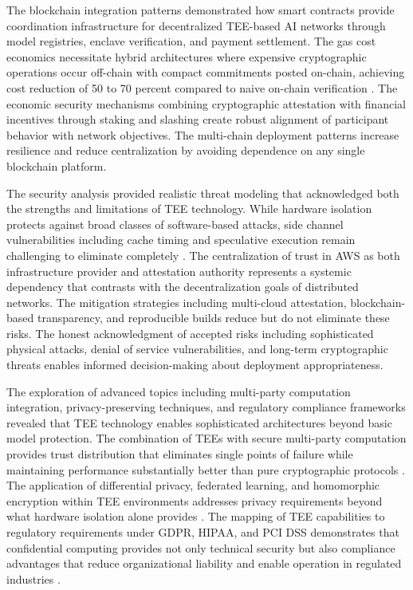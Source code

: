 The blockchain integration patterns demonstrated how smart contracts provide coordination infrastructure for decentralized TEE-based AI networks through model registries, enclave verification, and payment settlement. The gas cost economics necessitate hybrid architectures where expensive cryptographic operations occur off-chain with compact commitments posted on-chain, achieving cost reduction of 50 to 70 percent compared to naive on-chain verification \cite{gas_optimization}. The economic security mechanisms combining cryptographic attestation with financial incentives through staking and slashing create robust alignment of participant behavior with network objectives. The multi-chain deployment patterns increase resilience and reduce centralization by avoiding dependence on any single blockchain platform.

The security analysis provided realistic threat modeling that acknowledged both the strengths and limitations of TEE technology. While hardware isolation protects against broad classes of software-based attacks, side channel vulnerabilities including cache timing and speculative execution remain challenging to eliminate completely \cite{spectre_meltdown, foreshadow}. The centralization of trust in AWS as both infrastructure provider and attestation authority represents a systemic dependency that contrasts with the decentralization goals of distributed networks. The mitigation strategies including multi-cloud attestation, blockchain-based transparency, and reproducible builds reduce but do not eliminate these risks. The honest acknowledgment of accepted risks including sophisticated physical attacks, denial of service vulnerabilities, and long-term cryptographic threats enables informed decision-making about deployment appropriateness.

The exploration of advanced topics including multi-party computation integration, privacy-preserving techniques, and regulatory compliance frameworks revealed that TEE technology enables sophisticated architectures beyond basic model protection. The combination of TEEs with secure multi-party computation provides trust distribution that eliminates single points of failure while maintaining performance substantially better than pure cryptographic protocols \cite{secure_mpc}. The application of differential privacy, federated learning, and homomorphic encryption within TEE environments addresses privacy requirements beyond what hardware isolation alone provides \cite{differential_privacy, federated_learning, homomorphic_encryption}. The mapping of TEE capabilities to regulatory requirements under GDPR, HIPAA, and PCI DSS demonstrates that confidential computing provides not only technical security but also compliance advantages that reduce organizational liability and enable operation in regulated industries \cite{gdpr_compliance, hipaa_security, pci_dss}.

